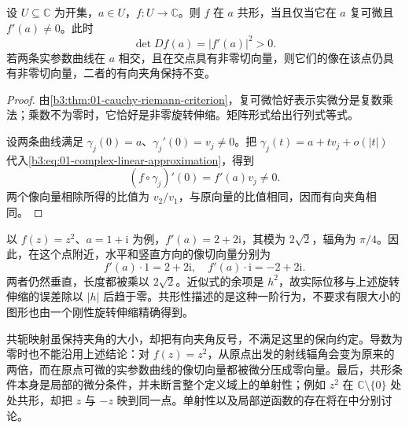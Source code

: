 \begin{proposition}\label{b3:prop:01-conformal-criterion}
设 \(U\subseteq\mathbb C\) 为开集，\(a\in U\)，\(f:U\to\mathbb C\)。则 \(f\) 在 \(a\) 共形，当且仅当它在 \(a\) 复可微且 \(f'(a)\ne0\)。此时
\[
 \det Df(a)=\lvert f'(a)\rvert^2>0.
\]
若两条实参数曲线在 \(a\) 相交，且在交点具有非零切向量，则它们的像在该点仍具有非零切向量，二者的有向夹角保持不变。
\end{proposition}
\begin{proof}
由\cref{b3:thm:01-cauchy-riemann-criterion}，复可微恰好表示实微分是复数乘法；乘数不为零时，它恰好是非零旋转伸缩。矩阵形式给出行列式等式。

设两条曲线满足 \(\gamma_j(0)=a\)、\(\gamma_j'(0)=v_j\ne0\)。把 \(\gamma_j(t)=a+tv_j+o(\lvert t\rvert)\) 代入\eqref{b3:eq:01-complex-linear-approximation}，得到
\[
 (f\circ\gamma_j)'(0)=f'(a)v_j\ne0.
\]
两个像向量相除所得的比值为 \(v_2/v_1\)，与原向量的比值相同，因而有向夹角相同。
\end{proof}

以 \(f(z)=z^2\)、\(a=1+\mathrm{i}\) 为例，\(f'(a)=2+2\mathrm{i}\)，其模为 \(2\sqrt2\)，辐角为 \(\pi/4\)。因此，在这个点附近，水平和竖直方向的像切向量分别为
\[
 f'(a)\cdot1=2+2\mathrm{i},
 \quad
 f'(a)\cdot\mathrm{i}=-2+2\mathrm{i}.
\]
两者仍然垂直，长度都被乘以 \(2\sqrt2\)。近似式的余项是 \(h^2\)，故实际位移与上述旋转伸缩的误差除以 \(|h|\) 后趋于零。共形性描述的是这种一阶行为，不要求有限大小的图形也由一个刚性旋转伸缩精确得到。

共轭映射虽保持夹角的大小，却把有向夹角反号，不满足这里的保向约定。导数为零时也不能沿用上述结论：对 \(f(z)=z^2\)，从原点出发的射线辐角会变为原来的两倍，而在原点可微的实参数曲线的像切向量都被微分压成零向量。最后，共形条件本身是局部的微分条件，并未断言整个定义域上的单射性；例如 \(z^2\) 在 \(\mathbb C\setminus\{0\}\) 处处共形，却把 \(z\) 与 \(-z\) 映到同一点。单射性以及局部逆函数的存在将在中分别讨论。
